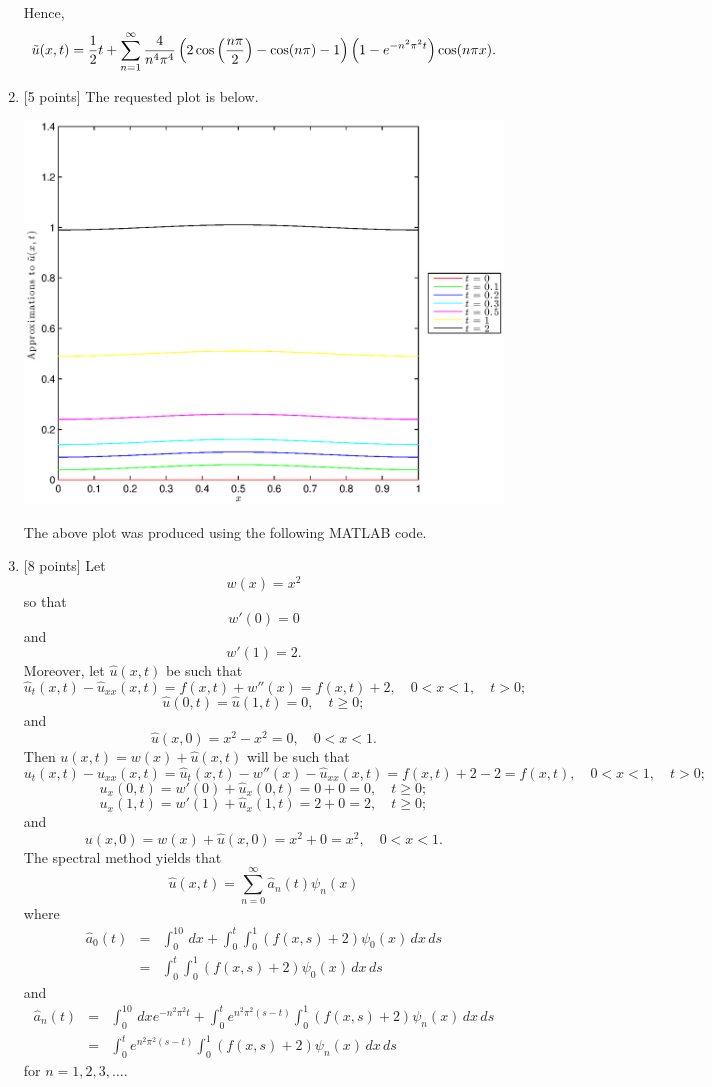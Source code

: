 \begin{solution}
\begin{enumerate}
Hence,
\[
\tilde{u}(x,t)={1 \over 2}t+\sum_{n=1}^\infty{4 \over n^4\pi^4}\left(2\cos\left({n\pi \over 2}\right)-\cos(n\pi)-1\right)\left(1-e^{-n^2\pi^2t}\right)\cos(n\pi x).
\]

\item {[5 points]} The requested plot is below.

\begin{center}\includegraphics[scale=0.7]{hw39b.eps}\end{center}

The above plot was produced using the following MATLAB code.



\item {[8 points]} Let
\[
w(x)=x^2
\]
so that
\[
w'(0)=0
\]
and
\[
w'(1)=2.
\]
Moreover, let $\hat{u}(x,t)$ be such that
\[
\hat{u}_t(x,t)-\hat{u}_{xx}(x,t) = f(x,t)+w''(x)=f(x,t)+2,\quad 0<x<1,\quad t>0;
\]
\[
\hat{u}(0,t) = \hat{u}(1,t) = 0,\quad t\ge0;
\]
and
\[
\hat{u}(x,0)=x^2-x^2=0,\quad 0<x<1.
\]
Then $u(x,t)=w(x)+\hat{u}(x,t)$ will be such that
\[
u_t(x,t)-u_{xx}(x,t)=\hat{u}_t(x,t)-w''(x)-\hat{u}_{xx}(x,t) = f(x,t)+2-2 = f(x,t),\quad 0<x<1,\quad t>0;
\]
\[
u_x(0,t) = w'(0) + \hat{u}_x(0,t) = 0+0 = 0,\quad t\ge0;
\]
\[
u_x(1,t) = w'(1) + \hat{u}_x(1,t) = 2+0 = 2,\quad t\ge0;
\]
and
\[
u(x,0)=w(x)+\hat{u}(x,0)=x^2+0=x^2,\quad 0<x<1.
\]
The spectral method yields that
\[
\hat{u}(x,t)=\sum_{n=0}^\infty \hat{a}_n(t)\psi_n(x)
\]
where
\begin{eqnarray*}
\hat{a}_0(t)&=&\int_0^10\,dx+\int_0^t\int_0^1\left(f(x,s)+2\right)\psi_0(x)\,dx\,ds
\\
&=&\int_0^t\int_0^1\left(f(x,s)+2\right)\psi_0(x)\,dx\,ds
\end{eqnarray*}
and
\begin{eqnarray*}
\hat{a}_n(t)&=&\int_0^10\,dx e^{-n^2\pi^2t}+\int_0^te^{n^2\pi^2\left(s-t\right)}\int_0^1\left(f(x,s)+2\right)\psi_n(x)\,dx\,ds
\\
&=&\int_0^te^{n^2\pi^2\left(s-t\right)}\int_0^1\left(f(x,s)+2\right)\psi_n(x)\,dx\,ds
\end{eqnarray*}
for $n=1,2,3,\ldots$.


\end{enumerate}
\end{solution}
